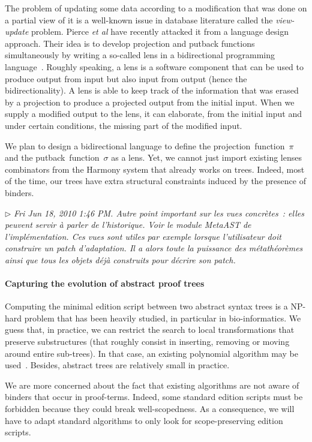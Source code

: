 \documentclass{article}
\newcommand{\remtext}[1]{\textcolor{bwgreen}{$\triangleright$ \textsl{#1}}}
\begin{document}
The problem of updating some data according to a modification that was
done on a partial view of it is a well-known issue in database
literature called the \textit{view-update} problem. Pierce \textit{et
  al} have recently attacked it from a language design approach. Their
idea is to develop projection and putback functions simultaneously by
writing a so-called lens in a bidirectional programming
language~\cite{pierce-bidirectional}. Roughly speaking, a lens is a
software component that can be used to produce output from input but
also input from output (hence the bidirectionality). A lens is able
to keep track of the information that was erased by a projection to
produce a projected output from the initial input. When we supply a
modified output to the lens, it can elaborate, from the initial input
and under certain conditions, the missing part of the modified input. 

We plan to design a bidirectional language to define the
projection~function~$\pi$ and the putback~function~$\sigma$ as a
lens. Yet, we cannot just import existing lenses combinators from the
Harmony system that already works on trees. Indeed, most of the time,
our trees have extra structural constraints induced by the presence of
binders. 

\remtext{Fri Jun 18, 2010 1:46 PM. Autre point important sur les vues
  concrètes~: elles peuvent servir à parler de l'historique.  Voir le
  module MetaAST de l'implémentation. Ces vues sont utiles par exemple
  lorsque l'utilisateur doit construire un patch d'adaptation. Il a
  alors toute la puissance des métathéorèmes ainsi que tous les objets
  déjà construits pour décrire son patch.}

\paragraph{Capturing the evolution of abstract proof trees}
\-

Computing the minimal edition script between two abstract syntax trees
is a NP-hard problem that has been heavily studied, in particular in
bio-informatics.  We guess that, in practice, we can restrict the
search to local transformations that preserve substructures (that
roughly consist in inserting, removing or moving around entire
sub-trees). In that case, an existing polynomial algorithm may be
used~\cite{Touzet05alinear}. Besides, abstract trees are relatively small in
practice. 

We are more concerned about the fact that existing algorithms are not
aware of binders that occur in proof-terms. Indeed, some standard
edition scripts must be forbidden because they could break
well-scopedness. As a consequence, we will have to adapt standard
algorithms to only look for scope-preserving edition scripts.
\end{document}
